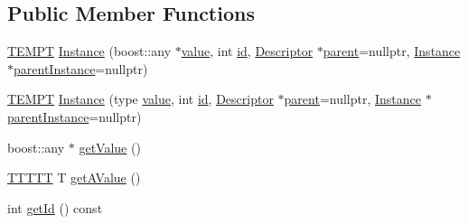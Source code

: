 \subsection*{Public Member Functions}
\begin{DoxyCompactItemize}
\item 
\mbox{\hyperlink{_v_m_global_8hpp_af309683c0c7b45cf126c8742c4251511}{T\+E\+M\+PT}} \mbox{\hyperlink{class_erable_1_1_erable_1_1_types_1_1_instance_a6e906dbe06e9f00a801dd55d185c1ffd}{Instance}} (boost\+::any $\ast$\mbox{\hyperlink{class_erable_1_1_erable_1_1_types_1_1_instance_a6f7a9514f61ceb2d8c22647fe3833ec3}{value}}, int \mbox{\hyperlink{class_erable_1_1_erable_1_1_types_1_1_instance_a4d587f5650cf567a76d00de2168b92bc}{id}}, \mbox{\hyperlink{class_erable_1_1_descriptor}{Descriptor}} $\ast$\mbox{\hyperlink{class_erable_1_1_erable_1_1_types_1_1_instance_a6726e76e24e7aa2907eba203c9b93f04}{parent}}=nullptr, \mbox{\hyperlink{class_erable_1_1_erable_1_1_types_1_1_instance}{Instance}} $\ast$\mbox{\hyperlink{class_erable_1_1_erable_1_1_types_1_1_instance_a785d3c2a59f2f4981696d9728130573c}{parent\+Instance}}=nullptr)
\item 
\mbox{\hyperlink{_v_m_global_8hpp_af309683c0c7b45cf126c8742c4251511}{T\+E\+M\+PT}} \mbox{\hyperlink{class_erable_1_1_erable_1_1_types_1_1_instance_a81e1063d389f60f07e678907ccaa0239}{Instance}} (type \mbox{\hyperlink{class_erable_1_1_erable_1_1_types_1_1_instance_a6f7a9514f61ceb2d8c22647fe3833ec3}{value}}, int \mbox{\hyperlink{class_erable_1_1_erable_1_1_types_1_1_instance_a4d587f5650cf567a76d00de2168b92bc}{id}}, \mbox{\hyperlink{class_erable_1_1_descriptor}{Descriptor}} $\ast$\mbox{\hyperlink{class_erable_1_1_erable_1_1_types_1_1_instance_a6726e76e24e7aa2907eba203c9b93f04}{parent}}=nullptr, \mbox{\hyperlink{class_erable_1_1_erable_1_1_types_1_1_instance}{Instance}} $\ast$\mbox{\hyperlink{class_erable_1_1_erable_1_1_types_1_1_instance_a785d3c2a59f2f4981696d9728130573c}{parent\+Instance}}=nullptr)
\item 
boost\+::any $\ast$ \mbox{\hyperlink{class_erable_1_1_erable_1_1_types_1_1_instance_ab4fc50181c0a2a3363758d2183968a20}{get\+Value}} ()
\item 
\mbox{\hyperlink{_v_m_global_8hpp_acc4b45cef33b2f364fb360284415cbd9}{T\+T\+T\+TT}} T \mbox{\hyperlink{class_erable_1_1_erable_1_1_types_1_1_instance_a216fccd90e272c31983ad84e583b8802}{get\+A\+Value}} ()
\item 
int \mbox{\hyperlink{class_erable_1_1_erable_1_1_types_1_1_instance_a89df1e28a3a33d9562bd9873863a89c8}{get\+Id}} () const
\item 

\end{DoxyCompactItemize}
